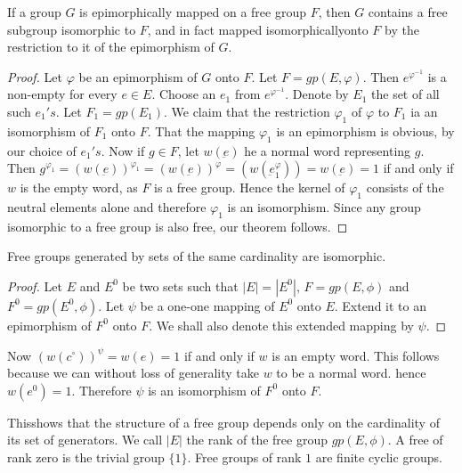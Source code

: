 \begin{theorem}\label{chap4:sec4:thm5}%
  If a group $G$ is epimorphically mapped on a free group $F$, then
  $G$ contains a free subgroup isomorphic to $F$, and in fact mapped
  isomorphically\pageoriginale onto $F$ by the restriction to it of the epimorphism
  of $G$. 
\end{theorem}

\begin{proof}
  Let $\varphi$ be an epimorphism of $G$ onto $F$. Let
  $F=gp(E,\varphi)$. Then $e^{\varphi^{-1}}$ is a non-empty for every $e
  \in E$. Choose an $e_1$ from $e^{\varphi^{-1}}$. Denote by $E_1$
  the set of all such $e_1's$. Let $F_1=gp(E_1)$. We claim that the
  restriction $\varphi_1$ of $\varphi$ to $F_1$ ia an isomorphism of
  $F_1$ onto $F$. That the
  mapping $\varphi_1$ is an epimorphism is obvious, by our choice of
  $e_1's$. Now if $g \in F$, let $w(\underbar{e})$ he a normal word
  representing $g$. Then
  $g^{\varphi_1}=(w(\underbar{e}))^{\varphi_1}=(w(\underbar{e}))^{\varphi}=
  (w(\underbar{e}^\varphi
  _1))=w(\underbar{e})=1$ if and only if $w$ is the empty word, as $F$
  is a free group. Hence the kernel of $\varphi _1$ consists of the
  neutral elements alone and therefore $\varphi_1$ is an
  isomorphism. Since any group isomorphic to a free group is also
  free, our theorem follows. 
\end{proof}

\begin{theorem}\label{chap4:sec4:thm6}%
  Free groups generated by sets of the same cardinality are isomorphic.
\end{theorem}

\begin{proof}
  Let $E$ and $E^0$ be two sets such that $|E|=|E^0|$, $F=gp(E,\phi)$
  and $F^0=gp(E^0, \phi)$. Let $\psi$ be a one-one mapping of $E^0$
  onto $E$. Extend it to an epimorphism of $F^0$ onto $F$. We shall
  also denote this extended mapping by $\psi$. 
\end{proof}

Now $(w(c^\circ))^\psi=w(e)=1$ if and only if $w$ is an empty word. This
follows because we can without loss of generality take $w$ to be a
normal word. hence $w(e^0)=1$. Therefore $\psi$ is an isomorphism of
$F^0$ onto $F$. 

This\pageoriginale shows that the structure of a free group depends only on the
cardinality of its set of generators. We call $|E|$ the rank of the
free group $gp(E, \phi)$. A free of rank zero is the trivial group $\{
1 \}$. Free groups of rank $1$ are finite cyclic groups. 

